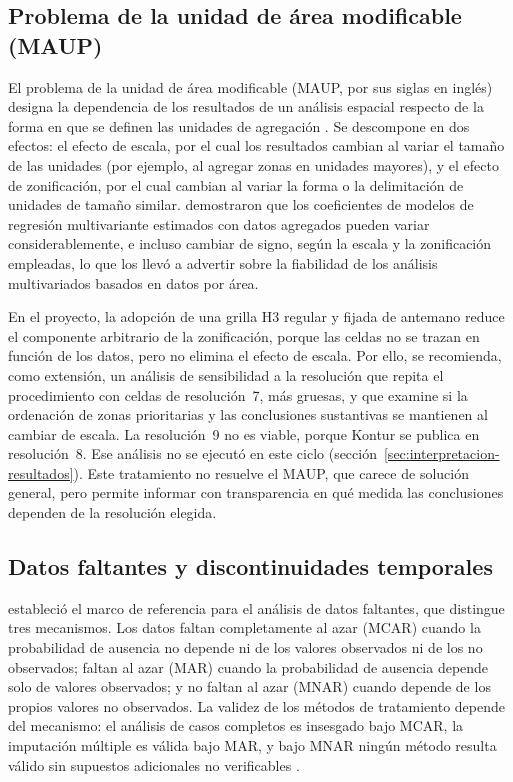 \subsection{Problema de la unidad de área modificable (MAUP)}
\label{subsec:maup}

El problema de la unidad de área modificable (MAUP, por sus siglas en inglés) designa la
dependencia de los resultados de un análisis espacial respecto de la forma en que se definen
las unidades de agregación \parencite{openshaw1984}. Se descompone en dos efectos: el efecto
de escala, por el cual los resultados cambian al variar el tamaño de las unidades (por
ejemplo, al agregar zonas en unidades mayores), y el efecto de zonificación, por el cual
cambian al variar la forma o la delimitación de unidades de tamaño similar.
\textcite{fotheringham1991} demostraron que los coeficientes de modelos de regresión
multivariante estimados con datos agregados pueden variar considerablemente, e incluso
cambiar de signo, según la escala y la zonificación empleadas, lo que los llevó a advertir
sobre la fiabilidad de los análisis multivariados basados en datos por área.

En el proyecto, la adopción de una grilla H3 regular y fijada de antemano reduce el
componente arbitrario de la zonificación, porque las celdas no se trazan en función de los
datos, pero no elimina el efecto de escala. Por ello, se recomienda, como extensión, un
análisis de sensibilidad a la resolución que repita el procedimiento con celdas de
resolución~7, más gruesas, y que examine si la ordenación de zonas prioritarias y las
conclusiones sustantivas se mantienen al cambiar de escala. La resolución~9 no es viable,
porque Kontur se publica en resolución~8. Ese análisis
no se ejecutó en este ciclo (sección~\ref{sec:interpretacion-resultados}). Este tratamiento no resuelve el MAUP, que carece de
solución general, pero permite informar con transparencia en qué medida las conclusiones
dependen de la resolución elegida.

\subsection{Datos faltantes y discontinuidades temporales}
\label{subsec:datos-faltantes}

\textcite{rubin1976} estableció el marco de referencia para el análisis de datos faltantes,
que distingue tres mecanismos. Los datos faltan completamente al azar (MCAR) cuando la
probabilidad de ausencia no depende ni de los valores observados ni de los no observados;
faltan al azar (MAR) cuando la probabilidad de ausencia depende solo de valores observados;
y no faltan al azar (MNAR) cuando depende de los propios valores no observados. La validez
de los métodos de tratamiento depende del mecanismo: el análisis de casos completos es
insesgado bajo MCAR, la imputación múltiple es válida bajo MAR, y bajo MNAR ningún método
resulta válido sin supuestos adicionales no verificables
\parencite{little2019,vanbuuren2018}.

